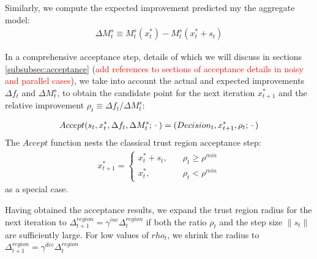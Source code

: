 Similarly, we compute the expected improvement predicted my the aggregate model:
\begin{align}
    \Delta M^{s}_t\equiv M_t^s(x_t^*) - M_t^s(x_t^*+s_t)
    \label{eq:expected-improvement}
\end{align}

In a comprehensive acceptance step, details of which we will discuss in sections \ref{subsubsec:acceptance} (\textcolor{red}{add references to sections of acceptance details in noisy and parallel cases}), we take into account the actual and expected improvements $\Delta f_t$ and $\Delta M_t^s$, to obtain the candidate point for the next iteration $x_{t+1}^*$ and the relative improvement $\rho_t\equiv \Delta f_t/ \Delta M^s_t$:

\begin{align}
    Accept(s_t,x_t^{*},\Delta f_t,\Delta M_t^s;\hspace{0.2em}\cdot\hspace{0.2em})=(Decision_t,x_{t+1}^{*},\rho_t;\hspace{0.2em}\cdot\hspace{0.2em})
    \label{eq:acceptance-core}
\end{align}
The $Accept$ function nests the classical trust region acceptance step:
\begin{align}
    x_{t+1}^*=\begin{cases}
        x_t^*+s_t,\quad&\rho_t\geq\rho^{min}\\
        x_t^*,\quad&\rho_t<\rho^{min}
    \end{cases}
    \label{eq:accept-classic}
\end{align}
as a special case.

Having obtained the acceptance results, we expand the trust region radius for the next iteration to $\Delta_{t+1}^{region}=\gamma^{inc}\Delta_t^{region}$ if both the ratio $\rho_t$ and the step size $\lVert s_t\rVert$ are sufficiently large. For low values of $rho_t$, we shrink the radius to $\Delta^{region}_{t+1} = \gamma^{dec}\Delta_t^{region}$
